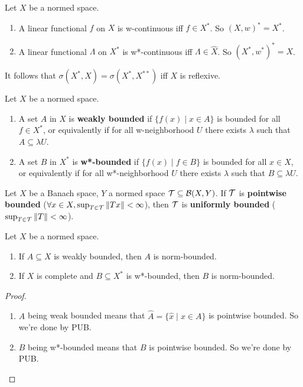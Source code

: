 \documentclass{article}
\begin{document}
\begin{prop}
  Let $X$ be a normed space.
  \begin{enumerate}
    \item A linear functional $f$ on $X$ is w-continuous iff $f \in X^*$. So $(X, w)^* = X^*$.
    \item A linear functional $\Lambda$ on $X^*$ is w*-continuous iff $\Lambda \in \hat X$. So $(X^*, w^*)^* = X$.
  \end{enumerate}
\end{prop}

It follows that $\sigma(X^*, X) = \sigma(X^*, X^{**})$ iff $X$ is reflexive.

\begin{dfn*}
  Let $X$ be a normed space.
  \begin{enumerate}
    \item A set $A$ in $X$ is {\bf weakly bounded} if $\{f(x) \mid x \in A\}$ is bounded for all $f \in X^*$, or equivalently if for all w-neighborhood $U$ there exists $\lambda$ such that $A \subseteq \lambda U$.
    \item A set $B$ in $X^*$ is {\bf w*-bounded} if $\{f(x) \mid f \in B\}$ is bounded for all $x \in X$, or equivalently if for all w*-neighborhood $U$ there exists $\lambda$ such that $B \subseteq \lambda U$.
  \end{enumerate}
\end{dfn*}

\begin{thm*}
  Let $X$ be a Banach space, $Y$ a normed space $\mathcal T \subseteq \mathcal B(X, Y)$. If $\mathcal T$ is {\bf pointwise bounded} ($\forall x \in X, \sup_{T \in \mathcal T} \left\lVert Tx\right\rVert < \infty$), then $\mathcal T$ is {\bf uniformly bounded} ($\sup_{T \in \mathcal T} \left\lVert T\right\rVert < \infty$).
\end{thm*}

\begin{prop}\label{prop:weak-norm-bounded}
  Let $X$ be a normed space.
  \begin{enumerate}
    \item If $A \subseteq X$ is weakly bounded, then $A$ is norm-bounded.
    \item If $X$ is complete and $B \subseteq X^*$ is w*-bounded, then $B$ is norm-bounded.
  \end{enumerate}
\end{prop}
\begin{proof}~
  \begin{enumerate}
    \item $A$ being weak bounded means that $\hat A = \{\hat x \mid x \in A\}$ is pointwise bounded. So we're done by PUB.
    \item $B$ being w*-bounded means that $B$ is pointwise bounded. So we're done by PUB.
  \end{enumerate}
\end{proof}
\end{document}

